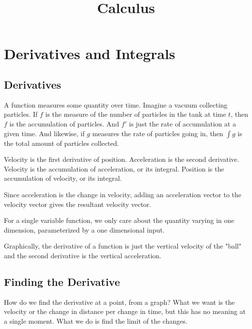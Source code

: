 \documentclass[../main.tex]{subfiles}
\title{Calculus}
\author{}
\date{}
\begin{document}
\maketitle
\tableofcontents

\newpage

\section{Derivatives and Integrals}

\subsection{Derivatives}

A function measures some quantity over time.
Imagine a vacuum collecting particles.
If \( f \) is the measure of the number of particles in the tank at time \( t \),
then \( f \) is the accumulation of particles.
And \( f' \) is just the rate of accumulation at a given time.
And likewise, if \( g \) measures the rate of particles going in,
then \( \int g \) is the total amount of particles collected.

Velocity is the first derivative of position.
Acceleration is the second derivative.
Velocity is the accumulation of acceleration, or its integral.
Position is the accumulation of velocity, or its integral.



Since acceleration is the change in velocity,
adding an acceleration vector to the velocity vector gives the resultant velocity vector.

For a single variable function, we only care about the quantity varying in one dimension,
parameterized by a one dimensional input.



Graphically, the derivative of a function is just the vertical velocity of the "ball"
and the second derivative is the vertical acceleration.


\subsection{Finding the Derivative}


How do we find the derivative at a point, from a graph?
What we want is the velocity or the change in distance per change in time,
but this has no meaning at a single moment.
What we do is find the limit of the changes.


\end{document}

